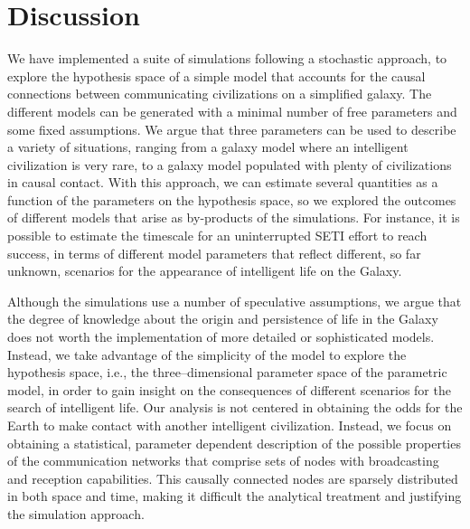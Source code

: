 \documentclass[crop]{CSLB}
\begin{document}
\section{Discussion}\label{S_discussion}

We have implemented a suite of simulations following a stochastic
approach, to explore the hypothesis space of a simple model that
accounts for the causal connections between communicating
civilizations on a simplified galaxy.
%
The different models can be generated with a minimal number of free
parameters and some fixed assumptions.
%
We argue that three parameters can be used to describe a variety of
situations, ranging from a galaxy model where an intelligent civilization is
very rare, to a galaxy model populated with plenty of civilizations in
causal contact.
%
With this approach, we can estimate several quantities as a function
of the parameters on the hypothesis space,
so we explored the outcomes of different models 
that arise as by-products of the simulations.
%
For instance, it is possible to estimate the timescale for an
uninterrupted SETI effort to reach success, in terms of different
model parameters that reflect different, so far unknown, scenarios for
the appearance of intelligent life on the Galaxy.






Although the simulations use a number of speculative assumptions, we
argue that the degree of knowledge about the origin and persistence of
life in the Galaxy does not worth the implementation of more detailed
or sophisticated models.
%
Instead, we take advantage of the simplicity of the model to explore
the hypothesis space, i.e., the three--dimensional parameter space of
the parametric model, in order to gain insight on the consequences of
different scenarios for the search of intelligent life.
%
Our analysis is not centered in obtaining the odds for the Earth
to make contact with another intelligent civilization.
%
Instead, we focus on obtaining a statistical, parameter dependent
description of the possible properties of the communication networks
that comprise sets of nodes with broadcasting and reception
capabilities.
%
This causally connected nodes are sparsely distributed in both space
and time, making it difficult the analytical treatment and justifying
the simulation approach.
\end{document}

